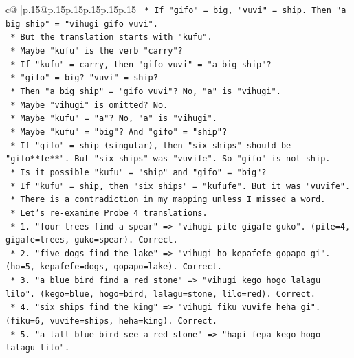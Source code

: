 \documentclass{article}
\begin{document}
{\begin{supertabular}{c@{$\;$}|p{.15\linewidth}@{}p{.15\linewidth}p{.15\linewidth}p{.15\linewidth}p{.15\linewidth}p{.15\linewidth}}
{{{\texttt{                    *   If "gifo" = big, "vuvi" = ship. Then "a big ship" = "vihugi gifo vuvi".} \\
\texttt{                    *   But the translation starts with "kufu".} \\
\texttt{                    *   Maybe "kufu" is the verb "carry"?} \\
\texttt{                    *   If "kufu" = carry, then "gifo vuvi" = "a big ship"?} \\
\texttt{                    *   "gifo" = big? "vuvi" = ship?} \\
\texttt{                    *   Then "a big ship" = "gifo vuvi"? No, "a" is "vihugi".} \\
\texttt{                    *   Maybe "vihugi" is omitted? No.} \\
\texttt{                    *   Maybe "kufu" = "a"? No, "a" is "vihugi".} \\
\texttt{                    *   Maybe "kufu" = "big"? And "gifo" = "ship"?} \\
\texttt{                    *   If "gifo" = ship (singular), then "six ships" should be "gifo**fe**". But "six ships" was "vuvife". So "gifo" is not ship.} \\
\texttt{                    *   Is it possible "kufu" = "ship" and "gifo" = "big"?} \\
\texttt{                    *   If "kufu" = ship, then "six ships" = "kufufe". But it was "vuvife".} \\
\texttt{                    *   There is a contradiction in my mapping unless I missed a word.} \\
\texttt{                    *   Let's re{-}examine Probe 4 translations.} \\
\texttt{                    *   1. "four trees find a spear" => "vihugi pile gigafe guko". (pile=4, gigafe=trees, guko=spear). Correct.} \\
\texttt{                    *   2. "five dogs find the lake" => "vihugi ho kepafefe gopapo gi". (ho=5, kepafefe=dogs, gopapo=lake). Correct.} \\
\texttt{                    *   3. "a blue bird find a red stone" => "vihugi kego hogo lalagu lilo". (kego=blue, hogo=bird, lalagu=stone, lilo=red). Correct.} \\
\texttt{                    *   4. "six ships find the king" => "vihugi fiku vuvife heha gi". (fiku=6, vuvife=ships, heha=king). Correct.} \\
\texttt{                    *   5. "a tall blue bird see a red stone" => "hapi fepa kego hogo lalagu lilo".} \\
}}}
\end{supertabular}}
\end{document}

